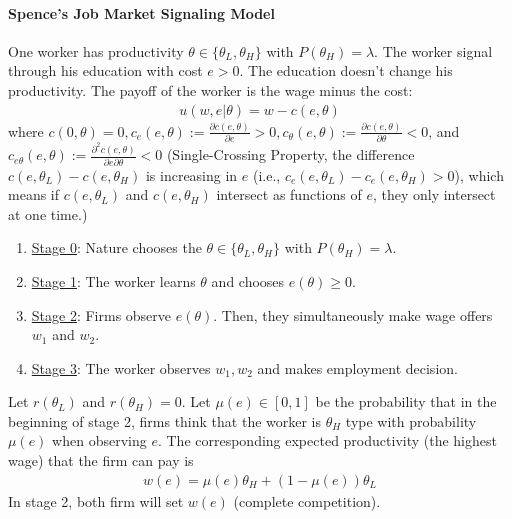 \documentclass[11pt]{elegantbook}
\begin{document}
\paragraph*{Spence's Job Market Signaling Model} One worker has productivity $\theta\in\{\theta_L,\theta_H\}$ with $P(\theta_H)=\lambda$. The worker signal through his education with cost $e>0$. The education doesn't change his productivity. The payoff of the worker is the wage minus the cost:
\begin{equation}
    \begin{aligned}
        u(w,e|\theta)=w-c(e,\theta)
    \end{aligned}
    \nonumber
\end{equation}
where $c(0,\theta)=0,c_e(e,\theta):=\frac{\partial c(e,\theta)}{\partial e}>0, c_\theta(e,\theta):=\frac{\partial c(e,\theta)}{\partial \theta}<0$, and $c_{e\theta}(e,\theta):=\frac{\partial^2 c(e,\theta)}{\partial e\partial \theta}<0$ (Single-Crossing Property, the difference $c(e,\theta_L)-c(e,\theta_H)$ is increasing in $e$ (i.e., $c_e(e,\theta_L)-c_e(e,\theta_H)>0$), which means if $c(e,\theta_L)$ and $c(e,\theta_H)$ intersect as functions of $e$, they only intersect at one time.)
\begin{enumerate}[]
    \item \underline{Stage 0}: Nature chooses the $\theta\in\{\theta_L,\theta_H\}$ with $P(\theta_H)=\lambda$.
    \item \underline{Stage 1}: The worker learns $\theta$ and chooses $e(\theta)\geq 0$.
    \item \underline{Stage 2}: Firms observe $e(\theta)$. Then, they simultaneously make wage offers $w_1$ and $w_2$.
    \item \underline{Stage 3}: The worker observes $w_1,w_2$ and makes employment decision.
\end{enumerate}
Let $r(\theta_L)$ and $r(\theta_H)=0$. Let $\mu(e)\in[0,1]$ be the probability that in the beginning of stage 2, firms think that the worker is $\theta_H$ type with probability $\mu(e)$ when observing $e$. The corresponding expected productivity (the highest wage) that the firm can pay is
\begin{equation}
    \begin{aligned}
        w(e)=\mu(e)\theta_H+(1-\mu(e))\theta_L
    \end{aligned}
    \nonumber
\end{equation}
In stage 2, both firm will set $w(e)$ (complete competition).
\end{document}
